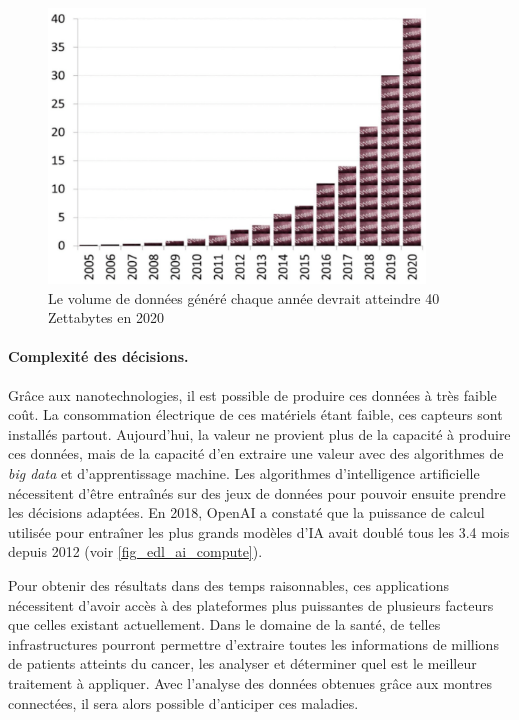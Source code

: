               
            \begin{figure}
            \center
            \includegraphics[width=10cm]{images/edl_bigdata.png}
            \caption{\label{fig_edl_bigdata} Le volume de données généré chaque année devrait atteindre 40 Zettabytes en 2020 \cite{Simoudis2016}}
            \end{figure}
        
        

            
        \paragraph{Complexité des décisions.} 
            
            Grâce aux nanotechnologies, il est possible de produire ces données à très faible coût. La consommation électrique de ces matériels étant faible, ces capteurs sont installés partout. Aujourd'hui, la valeur ne provient plus de la capacité à produire ces données, mais de la capacité d'en extraire une valeur avec des algorithmes de \textit{big data} et d'apprentissage machine. Les algorithmes d'intelligence artificielle nécessitent d'être entraînés sur des jeux de données pour pouvoir ensuite prendre les décisions adaptées. En 2018, OpenAI a constaté que la puissance de calcul utilisée pour entraîner les plus grands modèles d'IA avait doublé tous les 3.4 mois depuis 2012 (voir \autoref{fig_edl_ai_compute}). 
            
            Pour obtenir des résultats dans des temps raisonnables, ces applications nécessitent d'avoir accès à des plateformes plus puissantes de plusieurs facteurs que celles existant actuellement. Dans le domaine de la santé, de telles infrastructures pourront permettre d'extraire toutes les informations de millions de patients atteints du cancer, les analyser et déterminer quel est le meilleur traitement à appliquer. Avec l'analyse des données obtenues grâce aux montres connectées, il sera alors possible d'anticiper ces maladies.

